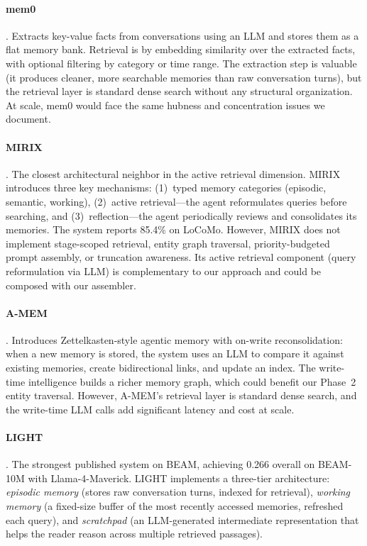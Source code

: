 \documentclass[11pt]{article}
\begin{document}
\paragraph{mem0} \citep{Chheda2024}.
Extracts key-value facts from conversations using an LLM and stores
them as a flat memory bank.  Retrieval is by embedding similarity
over the extracted facts, with optional filtering by category or time
range.  The extraction step is valuable (it produces cleaner, more
searchable memories than raw conversation turns), but the retrieval
layer is standard dense search without any structural organization.
At scale, mem0 would face the same hubness and concentration issues
we document.

\paragraph{MIRIX} \citep{Wang2025}.
The closest architectural neighbor in the active retrieval dimension.
MIRIX introduces three key mechanisms: (1)~typed memory categories
(episodic, semantic, working), (2)~active retrieval---the agent
reformulates queries before searching, and (3)~reflection---the
agent periodically reviews and consolidates its memories.  The
system reports 85.4\% on LoCoMo.  However, MIRIX does not implement
stage-scoped retrieval, entity graph traversal, priority-budgeted
prompt assembly, or truncation awareness.  Its active retrieval
component (query reformulation via LLM) is complementary to our
approach and could be composed with our assembler.

\paragraph{A-MEM} \citep{Xu2025}.
Introduces Zettelkasten-style agentic memory with on-write
reconsolidation: when a new memory is stored, the system uses an LLM
to compare it against existing memories, create bidirectional links,
and update an index.  The write-time intelligence builds a richer
memory graph, which could benefit our Phase~2 entity traversal.
However, A-MEM's retrieval layer is standard dense search, and the
write-time LLM calls add significant latency and cost at scale.

\paragraph{LIGHT} \citep{Tavakoli2026}.
The strongest published system on BEAM, achieving 0.266 overall on
BEAM-10M with Llama-4-Maverick.  LIGHT implements a three-tier
architecture: \emph{episodic memory} (stores raw conversation turns,
indexed for retrieval), \emph{working memory} (a fixed-size buffer
of the most recently accessed memories, refreshed each query), and
\emph{scratchpad} (an LLM-generated intermediate representation that
helps the reader reason across multiple retrieved passages).
\end{document}
